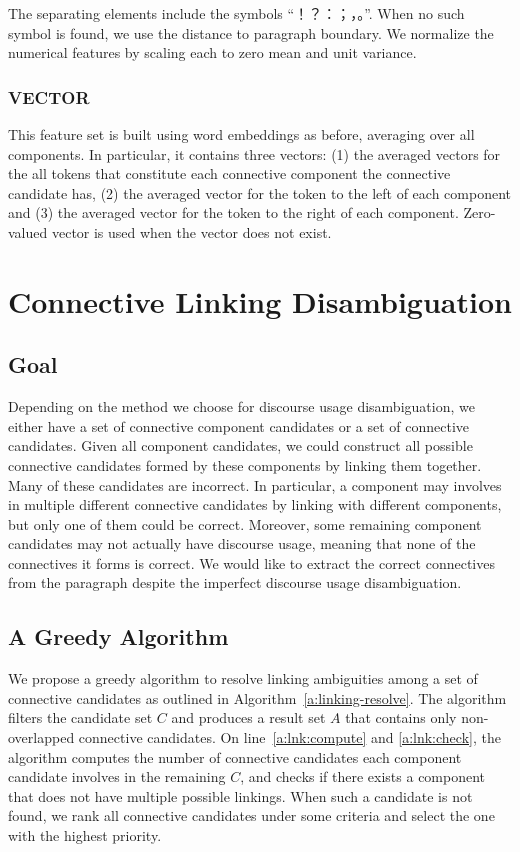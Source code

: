 The separating elements include the symbols ``！？：；，。''.
When no such symbol is found, we use the distance to paragraph boundary.
We normalize the numerical features by scaling each to zero mean and unit variance.

\subsubsection{VECTOR}

This feature set is built using word embeddings as before, averaging over all components.
In particular, it contains three vectors: (1) the averaged vectors
for the all tokens that constitute each connective component the connective candidate has,
(2) the averaged vector for the
token to the left of each component and (3) the averaged vector for the token to the
right of each component. Zero-valued vector is used when the vector does not exist.

\section{Connective Linking Disambiguation}
\label{s:linking-disambig}

\subsection{Goal}

Depending on the method we choose for discourse usage disambiguation, we
either have a set of connective component candidates or a set of connective
candidates. Given all component candidates, we could construct all possible
connective candidates formed by these components by linking them together.
Many of these candidates are incorrect. In particular, a component may involves in
multiple different connective candidates by linking with different components,
but only one of them could be correct. Moreover, some remaining component
candidates may not actually have discourse usage, meaning that none of
the connectives it forms is correct. We would like to extract the
correct connectives from the paragraph despite the imperfect discourse usage
disambiguation.

\subsection{A Greedy Algorithm}

We propose a greedy algorithm to resolve linking ambiguities among a set of
connective candidates as outlined in Algorithm~\ref{a:linking-resolve}.
The algorithm filters the candidate set $C$ and produces a result set $A$ that
contains only non-overlapped connective candidates. On line~\ref{a:lnk:compute}
and \ref{a:lnk:check}, the algorithm computes the number of connective candidates
each component candidate involves in the remaining $C$, and checks if there exists
a component that does not have multiple possible linkings. When such a candidate
is not found, we rank all connective candidates under some criteria
and select the one with the highest priority.

